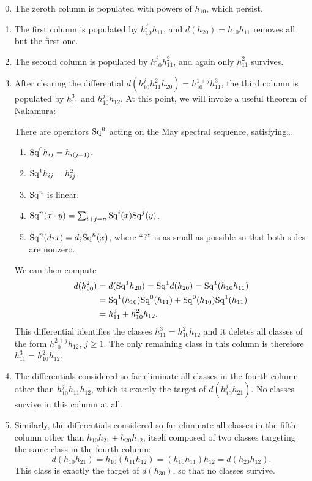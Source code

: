 \begin{enumerate}
    \setcounter{enumi}{-1}
    \item The zeroth column is populated with powers of $h_{10}$, which persist.
    \item The first column is populated by $h_{10}^j h_{11}$, and $d(h_{20}) = h_{10} h_{11}$ removes all but the first one.
    \item The second column is populated by $h_{10}^j h_{11}^2$, and again only $h_{11}^2$ survives.
    \item After clearing the differential $d(h_{10}^j h_{11}^2 h_{20}) = h_{10}^{1+j} h_{11}^3$, the third column is populated by $h_{11}^3$ and $h_{10}^j h_{12}$.
    At this point, we will invoke a useful theorem of Nakamura:
\begin{theorem}[Nakamura]
There are operators $\mathrm{Sq}^n$ acting on the May spectral sequence, satisfying\ldots
\begin{enumerate}
    \item $\mathrm{Sq}^0 h_{ij} = h_{i(j+1)}$.
    \item $\mathrm{Sq}^1 h_{ij} = h_{ij}^2$.
    \item $\mathrm{Sq}^n$ is linear.
    \item $\mathrm{Sq}^n(x \cdot y) = \sum_{i+j=n} \mathrm{Sq}^i(x) \mathrm{Sq}^j(y)$.
    \item $\mathrm{Sq}^n(d_? x) = d_? \mathrm{Sq}^n(x)$, where ``$?$'' is as small as possible so that both sides are nonzero.
\end{enumerate}
\end{theorem}
    We can then compute 
    \begin{align*}
    d(h_{20}^2) & = d(\mathrm{Sq}^1 h_{20}) = \mathrm{Sq}^1 d(h_{20}) = \mathrm{Sq}^1(h_{10} h_{11}) \\
    & = \mathrm{Sq}^1(h_{10}) \mathrm{Sq}^0(h_{11}) + \mathrm{Sq}^0(h_{10}) \mathrm{Sq}^1(h_{11}) \\
    & = h_{11}^3 + h_{10}^2 h_{12}.
    \end{align*}
    This differential identifies the classes $h_{11}^3 = h_{10}^2 h_{12}$ and it deletes all classes of the form $h_{10}^{2+j} h_{12}$, $j \ge 1$.
    The only remaining class in this column is therefore $h_{11}^3 = h_{10}^2 h_{12}$.
    \item The differentials considered so far eliminate all classes in the fourth column other than $h_{10}^j h_{11} h_{12}$, which is exactly the target of $d(h_{10}^j h_{21})$.
    No classes survive in this column at all.
    \item Similarly, the differentials considered so far eliminate all classes in the fifth column other than $h_{10} h_{21} + h_{20} h_{12}$, itself composed of two classes targeting the same class in the fourth column: \[d(h_{10} h_{21}) = h_{10}(h_{11} h_{12}) = (h_{10} h_{11}) h_{12} = d(h_{20} h_{12}).\]
    This class is exactly the target of $d(h_{30})$, so that no classes survive.
\end{enumerate}

